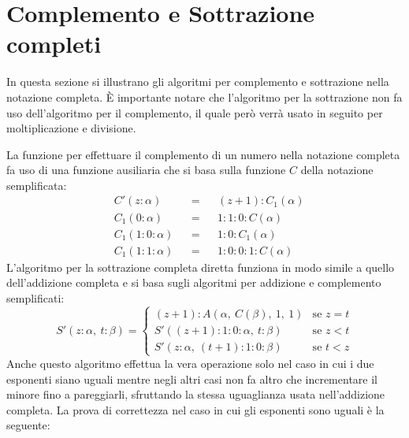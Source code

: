 \documentclass[Lau,oneside]{sapthesis}
\begin{document}
\section{Complemento e Sottrazione completi}
In questa sezione si illustrano gli algoritmi per complemento e sottrazione nella notazione completa. È importante notare che l'algoritmo per la sottrazione non fa uso dell'algoritmo per il complemento, il quale però verrà usato in seguito per moltiplicazione e divisione.

La funzione per effettuare il complemento di un numero nella notazione completa fa uso di una funzione ausiliaria che si basa sulla funzione $C$ della notazione semplificata:
\begin{align*}
&C'(z:\alpha) && = && (z+1):C_1(\alpha)\\
&C_1(0:\alpha) && = && 1:1:0:C(\alpha)\\
&C_1(1:0:\alpha) && = && 1:0:C_1(\alpha)\\
&C_1(1:1:\alpha) && = && 1:0:0:1:C(\alpha)
\end{align*}
L'algoritmo per la sottrazione completa diretta funziona in modo simile a quello dell'addizione completa e si basa sugli algoritmi per addizione e complemento semplificati:
\begin{equation*}
S'(z:\alpha, \ t:\beta) = \begin{cases}
(z+1):A(\alpha, \ C(\beta), \ 1, \ 1) & \text{se $z=t$}\\
S'((z+1):1:0:\alpha, \ t:\beta) & \text{se $z<t$}\\
S'(z:\alpha, \ (t+1):1:0:\beta) & \text{se $t<z$}
\end{cases}
\end{equation*}
Anche questo algoritmo effettua la vera operazione solo nel caso in cui i due esponenti siano uguali mentre negli altri casi non fa altro che incrementare il minore fino a pareggiarli, sfruttando la stessa uguaglianza usata nell'addizione completa. La prova di correttezza nel caso in cui gli esponenti sono uguali è la seguente:
\end{document}
